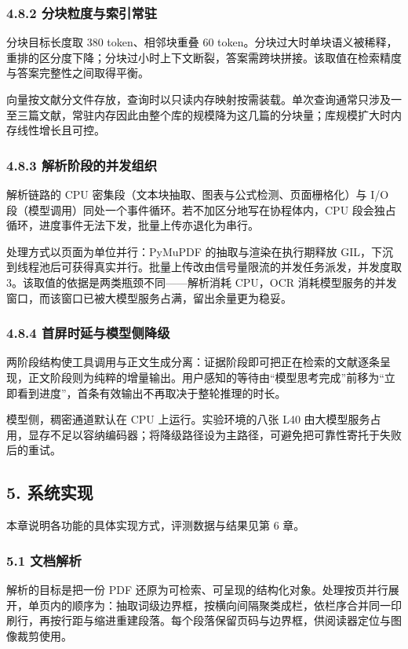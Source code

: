 \documentclass[UTF8,fontset=windows,zihao=5,a4paper]{ctexart}
\begin{document}
\subsubsection*{4.8.2 分块粒度与索引常驻}
分块目标长度取 380 token、相邻块重叠 60 token。分块过大时单块语义被稀释，重排的区分度下降；分块过小时上下文断裂，答案需跨块拼接。该取值在检索精度与答案完整性之间取得平衡。

向量按文献分文件存放，查询时以只读内存映射按需装载。单次查询通常只涉及一至三篇文献，常驻内存因此由整个库的规模降为这几篇的分块量；库规模扩大时内存线性增长且可控。

\subsubsection*{4.8.3 解析阶段的并发组织}
解析链路的 CPU 密集段（文本块抽取、图表与公式检测、页面栅格化）与 I/O 段（模型调用）同处一个事件循环。若不加区分地写在协程体内，CPU 段会独占循环，进度事件无法下发，批量上传亦退化为串行。

处理方式以页面为单位并行：PyMuPDF 的抽取与渲染在执行期释放 GIL，下沉到线程池后可获得真实并行。批量上传改由信号量限流的并发任务派发，并发度取 3。该取值的依据是两类瓶颈不同——解析消耗 CPU，OCR 消耗模型服务的并发窗口，而该窗口已被大模型服务占满，留出余量更为稳妥。

\subsubsection*{4.8.4 首屏时延与模型侧降级}
两阶段结构使工具调用与正文生成分离：证据阶段即可把正在检索的文献逐条呈现，正文阶段则为纯粹的增量输出。用户感知的等待由“模型思考完成”前移为“立即看到进度”，首条有效输出不再取决于整轮推理的时长。

模型侧，稠密通道默认在 CPU 上运行。实验环境的八张 L40 由大模型服务占用，显存不足以容纳编码器；将降级路径设为主路径，可避免把可靠性寄托于失败后的重试。

\subsection*{5. 系统实现}
本章说明各功能的具体实现方式，评测数据与结果见第 6 章。

\subsubsection*{5.1 文档解析}
解析的目标是把一份 PDF 还原为可检索、可呈现的结构化对象。处理按页并行展开，单页内的顺序为：抽取词级边界框，按横向间隔聚类成栏，依栏序合并同一印刷行，再按行距与缩进重建段落。每个段落保留页码与边界框，供阅读器定位与图像裁剪使用。
\end{document}
